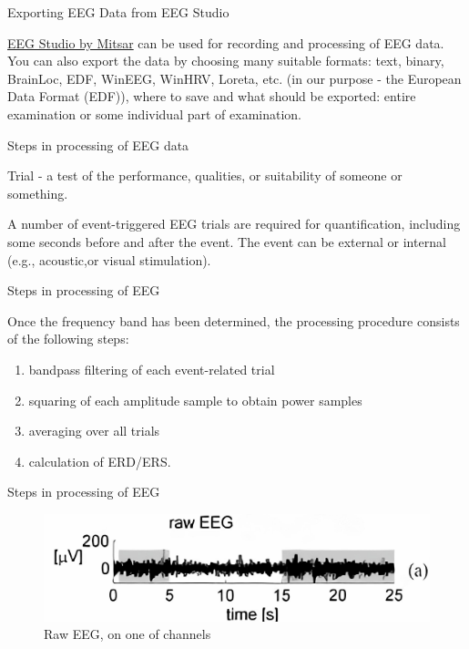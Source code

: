 \documentclass{beamer}
\begin{document}
\begin{frame}
{\centerline{Exporting EEG Data from EEG Studio}}
\href{http://www.mitsar-eeg.ru/page1.php?id=update}{EEG Studio by Mitsar} can be used for recording and processing of EEG data. You can also export the data by choosing many suitable formats: text, binary, BrainLoc, EDF, WinEEG, WinHRV, Loreta, etc. (in our purpose - the European Data Format (EDF)), where to save and what should be exported: entire examination or some individual part of examination.
\end{frame}

\begin{frame}
{\centerline{Steps in processing of EEG data}}
Trial - a test of the performance, qualities, or suitability of someone or something.

A number of event-triggered EEG trials are required for quantification, including some seconds before and after the event. The event can be external or internal (e.g., acoustic,or visual stimulation).
\end{frame}

\begin{frame}
{\centerline{Steps in processing of EEG}}

 Once the frequency band has been determined, the processing procedure consists of the following steps: 
 \begin{enumerate}
    \item bandpass filtering of each event-related trial
    \item squaring of each amplitude sample to obtain power samples
    \item averaging over all trials
    \item calculation of ERD/ERS.
 \end{enumerate}
    
\end{frame}

\begin{frame}
{\centerline{Steps in processing of EEG}}
 \begin{figure}
     \centering
     \includegraphics[width=\linewidth]{P2023.AIBCCSS.BrainSignals/Raw EEG.jpg}
     \caption{Raw EEG, on one of channels}
 \end{figure}
\end{frame}
\end{document}
